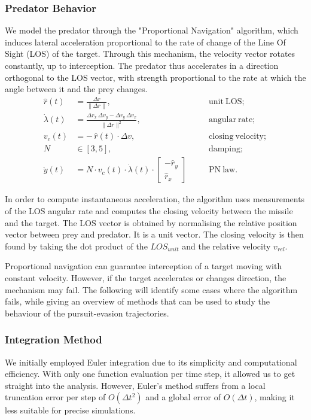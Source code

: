 \documentclass[10pt, twocolumn]{article}
\begin{document}
    \subsubsection{Predator Behavior}
    We model the predator through the "Proportional Navigation" algorithm, which induces lateral acceleration proportional to the rate of change of the Line Of Sight (LOS) of the target. Through this mechanism, the velocity vector rotates constantly, up to interception. The predator thus accelerates in a direction orthogonal to the LOS vector, with strength proportional to the rate at which the angle between it and the prey changes.
    \[
      \begin{aligned}
        \hat r(t) &= \frac{\Delta r}{\|\Delta r\|},
        &\quad &\mathrm{unit\ LOS};\\
        \dot\lambda(t) &= \frac{\Delta r_x\,\Delta v_y - \Delta r_y\,\Delta v_x}{\|\Delta r\|^2},
        &\quad &\mathrm{angular\ rate};\\
        v_c(t) &= -\,\hat r(t)\cdot\Delta v,
        &\quad &\mathrm{closing\ velocity};\\
        N &\in [3,5],
        &\quad &\mathrm{damping};\\
        \ddot{y}(t) &= N \cdot v_c(t) \cdot \dot{\lambda}(t) \cdot
        \begin{bmatrix} -\hat{r}_y \\ \hat{r}_x
        \end{bmatrix}
        &\quad &\mathrm{PN\ law}.
      \end{aligned}
    \]

    In order to compute instantaneous acceleration, the algorithm uses measurements of the LOS angular rate and computes the closing velocity between the missile and the target. The LOS vector is obtained by normalising the relative position vector between prey and predator. It is a unit vector. The closing velocity is then found by taking the dot product of the $\textit{LOS}_{unit}$ and the relative velocity $\textit{v}_{rel}$.

    Proportional navigation can guarantee interception of a target moving with constant velocity. However, if the target accelerates or changes direction, the mechanism may fail. The following will identify some cases where the algorithm fails, while giving an overview of methods that can be used to study the behaviour of the pursuit-evasion trajectories.

    \subsubsection{Integration Method}
    We initially employed Euler integration due to its simplicity and computational efficiency. With only one function evaluation per time step, it allowed us to get straight into the analysis. However, Euler's method suffers from a local truncation error per step of $O(\Delta t^2)$ and a global error of $O(\Delta t)$, making it less suitable for precise simulations.
\end{document}
